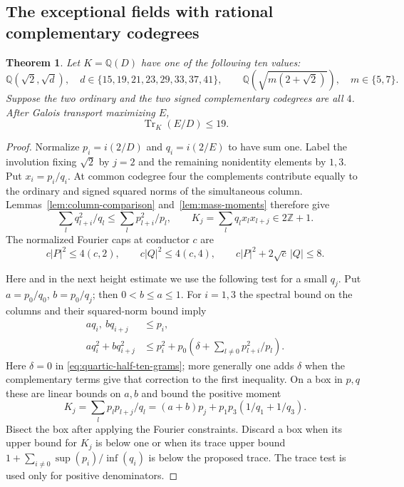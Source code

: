 \documentclass[11pt,reqno]{amsart}
\newtheorem{theorem}{Theorem}[section]
\theoremstyle{remark}\newtheorem{remark}[theorem]{Remark}
\numberwithin{equation}{section}
\begin{document}
\subsection{The exceptional fields with rational complementary codegrees}
\begin{theorem}\label{thm:half-ten-grams}
Let $K=\mathbb Q(D)$ have one of the following ten values:
\[
 \mathbb Q(\sqrt2,\sqrt d),\quad d\in\{15,19,21,23,29,33,37,41\},
 \qquad \mathbb Q\!\left(\sqrt{m(2+\sqrt 2)}\right),\quad m\in\{5,7\}.
\]
Suppose the two ordinary and the two signed complementary codegrees
are all $4$. After Galois transport maximizing $E$,
\[
                    \operatorname{Tr}_K(E/D)\le19.
\]
\end{theorem}
\begin{proof}
Normalize $p_i=i(2/D)$ and $q_i=i(2/E)$ to have sum one. Label the
involution fixing $\sqrt2$ by $j=2$ and the remaining nonidentity
elements by $1,3$. Put $x_i=p_i/q_i$. At common codegree four the
complements contribute equally to the ordinary and signed squared
norms of the simultaneous column.
Lemmas~\ref{lem:column-comparison} and~\ref{lem:mass-moments} therefore give
\begin{equation}\label{eq:quartic-half-ten-grams}
 \sum_l q_{l+i}^2/q_l\le\sum_l p_{l+i}^2/p_l,\qquad
 K_j=\sum_l q_l x_l x_{l+j}\in 2\mathbb Z+1 .
\end{equation}
The normalized Fourier caps at conductor $c$ are
\[
 c|P|^2\le4(c,2),\qquad c|Q|^2\le4(c,4),\qquad
 c|P|^2+2\sqrt c\,|Q|\le8 .
\]

Here and in the next height estimate we use the following test for a
small $q_j$. Put $a=p_0/q_0$, $b=p_0/q_j$; then $0<b\le a\le1$.
For $i=1,3$ the spectral bound on the columns and their squared-norm
bound imply
\begin{align*}
 aq_i,\ bq_{i+j}&\le p_i,\\
 aq_i^2+bq_{i+j}^2&\le p_i^2+
 p_0\left(\delta+\sum_{l\ne0}p_{l+i}^2/p_l\right).
\end{align*}
Here $\delta=0$ in \eqref{eq:quartic-half-ten-grams}; more generally
one adds $\delta$ when the complementary terms give that correction
to the first inequality. On a box in $p,q$ these are linear bounds
on $a,b$ and bound the positive moment
\[
  K_j=\sum_l p_l p_{l+j}/q_l=(a+b)p_j+p_1p_3(1/q_1+1/q_3).
\]
Bisect the box after applying the Fourier constraints. Discard a
box when its upper bound for $K_j$ is below one or when its trace
upper bound $1+\sum_{i\ne0}\sup(p_i)/\inf(q_i)$ is below the
proposed trace. The trace test is used only for positive denominators.


\end{proof}
\end{document}
